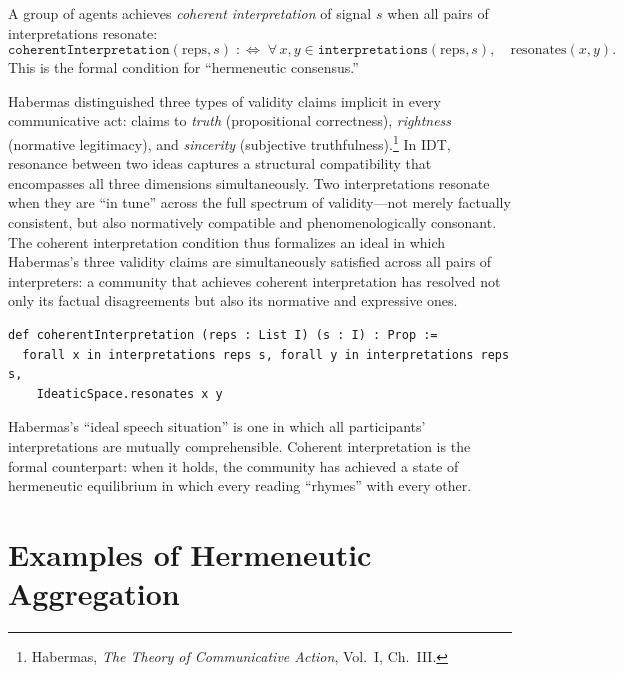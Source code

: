 \begin{definition}
\label{def:coherentInterpretation}
A group of agents achieves \emph{coherent interpretation} of signal $s$ when
all pairs of interpretations resonate:
\[
  \texttt{coherentInterpretation}(\text{reps}, s) \;:\Longleftrightarrow\;
  \forall\, x, y \in \texttt{interpretations}(\text{reps}, s),\quad
  \text{resonates}(x, y).
\]
This is the formal condition for ``hermeneutic consensus.''
\end{definition}

\begin{remark}
\label{rem:resonance_validity}
Habermas distinguished three types of validity claims implicit in every
communicative act: claims to \emph{truth} (propositional correctness),
\emph{rightness} (normative legitimacy), and \emph{sincerity} (subjective
truthfulness).\footnote{Habermas, \textit{The Theory of Communicative
Action}, Vol.\ I, Ch.\ III.}  In IDT, resonance between two ideas captures
a structural compatibility that encompasses all three dimensions
simultaneously.  Two interpretations resonate when they are ``in tune''
across the full spectrum of validity---not merely factually consistent, but
also normatively compatible and phenomenologically consonant.  The coherent
interpretation condition thus formalizes an ideal in which Habermas's three
validity claims are simultaneously satisfied across all pairs of
interpreters: a community that achieves coherent interpretation has
resolved not only its factual disagreements but also its normative and
expressive ones.
\end{remark}

\begin{lstlisting}[caption={Coherent interpretation in Lean}]
def coherentInterpretation (reps : List I) (s : I) : Prop :=
  forall x in interpretations reps s, forall y in interpretations reps s,
    IdeaticSpace.resonates x y
\end{lstlisting}

Habermas's ``ideal speech situation'' is one in which all participants'
interpretations are mutually comprehensible.  Coherent interpretation is the
formal counterpart: when it holds, the community has achieved a state of
hermeneutic equilibrium in which every reading ``rhymes'' with every other.

\section{Examples of Hermeneutic Aggregation}
\label{sec:ch19-examples}

